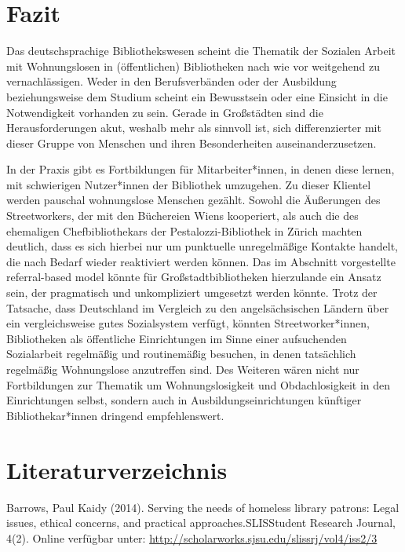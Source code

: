 \documentclass[a4paper,
fontsize=11pt,
oneside,
numbers=noperiodatend,
parskip=half-,
bibliography=totoc,
final
]{scrartcl}
\begin{document}
\hypertarget{fazit}{%
\section{Fazit}\label{fazit}}

Das deutschsprachige Bibliothekswesen scheint die Thematik der Sozialen
Arbeit mit Wohnungslosen in (öffentlichen) Bibliotheken nach wie vor
weitgehend zu vernachlässigen. Weder in den Berufsverbänden oder der
Ausbildung beziehungsweise dem Studium scheint ein Bewusstsein oder eine
Einsicht in die Notwendigkeit vorhanden zu sein. Gerade in Großstädten
sind die Herausforderungen akut, weshalb mehr als sinnvoll ist, sich
differenzierter mit dieser Gruppe von Menschen und ihren Besonderheiten
auseinanderzusetzen.

In der Praxis gibt es Fortbildungen für Mitarbeiter*innen, in denen
diese lernen, mit schwierigen Nutzer*innen der Bibliothek umzugehen. Zu
dieser Klientel werden pauschal wohnungslose Menschen gezählt. Sowohl
die Äußerungen des Streetworkers, der mit den Büchereien Wiens
kooperiert, als auch die des ehemaligen Chefbibliothekars der
Pestalozzi-Bibliothek in Zürich machten deutlich, dass es sich hierbei
nur um punktuelle unregelmäßige Kontakte handelt, die nach Bedarf wieder
reaktiviert werden können. Das im Abschnitt vorgestellte referral-based
model könnte für Großstadtbibliotheken hierzulande ein Ansatz sein, der
pragmatisch und unkompliziert umgesetzt werden könnte. Trotz der
Tatsache, dass Deutschland im Vergleich zu den angelsächsischen Ländern
über ein vergleichsweise gutes Sozialsystem verfügt, könnten
Streetworker*innen, Bibliotheken als öffentliche Einrichtungen im Sinne
einer aufsuchenden Sozialarbeit regelmäßig und routinemäßig besuchen, in
denen tatsächlich regelmäßig Wohnungslose anzutreffen sind. Des Weiteren
wären nicht nur Fortbildungen zur Thematik um Wohnungslosigkeit und
Obdachlosigkeit in den Einrichtungen selbst, sondern auch in
Ausbildungseinrichtungen künftiger Bibliothekar*innen dringend
empfehlenswert.

\hypertarget{literaturverzeichnis}{%
\section{Literaturverzeichnis}\label{literaturverzeichnis}}

Barrows, Paul Kaidy (2014). Serving the needs of homeless library
patrons: Legal issues, ethical concerns, and practical
approaches.SLISStudent Research Journal, 4(2). Online verfügbar unter:
\url{http://scholarworks.sjsu.edu/slissrj/vol4/iss2/3}
\end{document}
